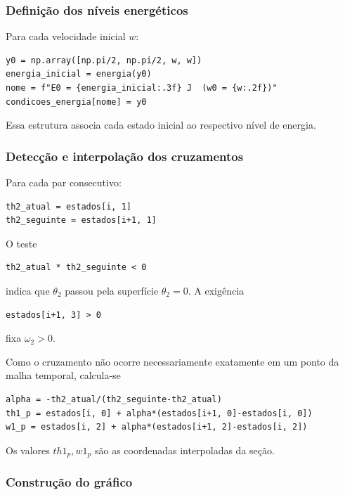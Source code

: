 \documentclass[12pt,a4paper]{article}
\begin{document}
\subsubsection{Definição dos níveis energéticos}

Para cada velocidade inicial $w$:

\begin{lstlisting}
y0 = np.array([np.pi/2, np.pi/2, w, w])
energia_inicial = energia(y0)
nome = f"E0 = {energia_inicial:.3f} J  (w0 = {w:.2f})"
condicoes_energia[nome] = y0
\end{lstlisting}

Essa estrutura associa cada estado inicial ao respectivo nível de energia.

\subsubsection{Detecção e interpolação dos cruzamentos}

Para cada par consecutivo:

\begin{lstlisting}
th2_atual = estados[i, 1]
th2_seguinte = estados[i+1, 1]
\end{lstlisting}

O teste

\begin{lstlisting}
th2_atual * th2_seguinte < 0
\end{lstlisting}

indica que $\theta_2$ passou pela superfície $\theta_2=0$. A exigência

\begin{lstlisting}
estados[i+1, 3] > 0
\end{lstlisting}

fixa $\omega_2>0$.

Como o cruzamento não ocorre necessariamente exatamente em um ponto da malha temporal, calcula-se

\begin{lstlisting}
alpha = -th2_atual/(th2_seguinte-th2_atual)
th1_p = estados[i, 0] + alpha*(estados[i+1, 0]-estados[i, 0])
w1_p = estados[i, 2] + alpha*(estados[i+1, 2]-estados[i, 2])
\end{lstlisting}

Os valores ${th1_p,w1_p}$ são as coordenadas interpoladas da seção.

\subsubsection{Construção do gráfico}
\end{document}
